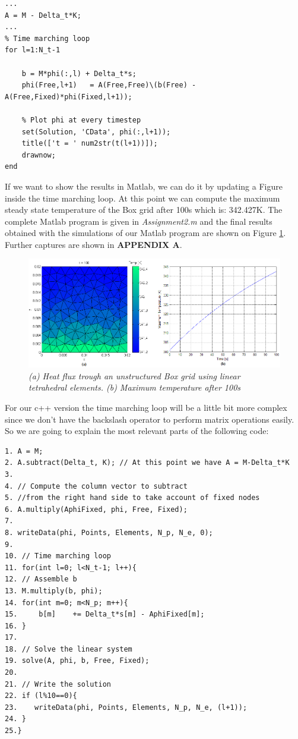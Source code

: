 \documentclass[12pt]{article}
\begin{document}
\begin{lstlisting}
...
A = M - Delta_t*K;
...
% Time marching loop
for l=1:N_t-1
	
	b = M*phi(:,l) + Delta_t*s;
	phi(Free,l+1)	= A(Free,Free)\(b(Free) - A(Free,Fixed)*phi(Fixed,l+1));
	
	% Plot phi at every timestep
    set(Solution, 'CData', phi(:,l+1));
    title(['t = ' num2str(t(l+1))]);
    drawnow;
end
\end{lstlisting}

If we want to show the results in Matlab, we can do it by updating a Figure inside the time marching loop. At this point we can compute the maximum steady state temperature of the Box grid after 100s which is: 342.427K. The complete Matlab program is given in \textit{Assignment2.m} and the final results obtained with the simulations of our Matlab program are shown on Figure \ref{fig:matlab1}. Further captures are shown in \textbf{APPENDIX A}.

\begin{figure}[h!]
    \includegraphics[scale=0.6]{matlab1}
    \caption{\textit{(a) Heat flux trough an unstructured Box grid using linear tetrahedral elements. (b) Maximum temperature after 100s}}
    \label{fig:matlab1}
\end{figure}

For our c++ version the time marching loop will be a little bit more complex since we don't have the backslash operator to perform matrix operations easily. So we are going to explain the most relevant parts of the following code:

\begin{lstlisting}[style=MyC++Style] 
1. A = M;
2. A.subtract(Delta_t, K); // At this point we have A = M-Delta_t*K
3.
4. // Compute the column vector to subtract 
5. //from the right hand side to take account of fixed nodes
6. A.multiply(AphiFixed, phi, Free, Fixed);
7.
8. writeData(phi, Points, Elements, N_p, N_e, 0);
9. 
10. // Time marching loop
11. for(int l=0; l<N_t-1; l++){
12.	// Assemble b
13.	M.multiply(b, phi);
14.	for(int m=0; m<N_p; m++){
15.		b[m]	+= Delta_t*s[m] - AphiFixed[m];
16.	}
17.
18.	// Solve the linear system
19.	solve(A, phi, b, Free, Fixed);
20.
21.	// Write the solution
22.	if (l%10==0){
23.	   writeData(phi, Points, Elements, N_p, N_e, (l+1));
24.	}
25.}
\end{lstlisting}
\end{document}
